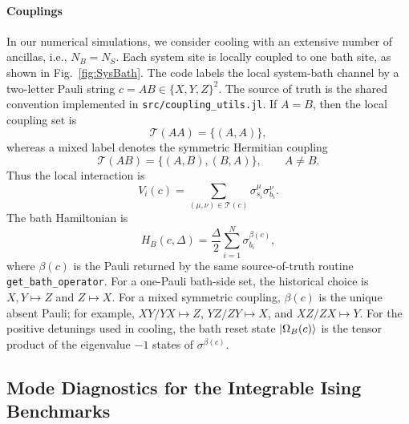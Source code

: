 \documentclass[aps,pra,twocolumn,superscriptaddress,nolongbibliography,nobalancelastpage,10pt]{revtex4-2}
\begin{document}
\paragraph{Couplings}
In our numerical simulations, we consider cooling with an extensive number of
ancillas, i.e., \(N_B=N_S\).  Each system site is locally coupled to one bath
site, as shown in Fig.~\ref{fig:SysBath}.  The code labels the local
system-bath channel by a two-letter Pauli string
\(c=AB\in\{X,Y,Z\}^2\).  The source of truth is the shared convention
implemented in \texttt{src/coupling\_utils.jl}.  If \(A=B\), then the local
coupling set is
\begin{equation}
	\mathcal{T}(AA)=\{(A,A)\},
\end{equation}
whereas a mixed label denotes the symmetric Hermitian coupling
\begin{equation}
	\mathcal{T}(AB)=\{(A,B),(B,A)\},
	\qquad A\neq B .
\end{equation}
Thus the local interaction is
\begin{equation}
	V_i(c)=\sum_{(\mu,\nu)\in\mathcal{T}(c)}
	\sigma^\mu_{s_i}\sigma^\nu_{b_i}.
	\label{eq:tn_local_coupling_convention}
\end{equation}
The bath Hamiltonian is
\begin{equation}
	H_B(c,\Delta)=\frac{\Delta}{2}\sum_{i=1}^N
	\sigma^{\beta(c)}_{b_i},
\end{equation}
where \(\beta(c)\) is the Pauli returned by the same source-of-truth routine
\texttt{get\_bath\_operator}.  For a one-Pauli bath-side set, the historical
choice is \(X,Y\mapsto Z\) and \(Z\mapsto X\).  For a mixed symmetric
coupling, \(\beta(c)\) is the unique absent Pauli; for example,
\(XY/YX\mapsto Z\), \(YZ/ZY\mapsto X\), and \(XZ/ZX\mapsto Y\).  For the
positive detunings used in cooling, the bath reset state
\(\ket{\Omega_B(c)}\) is the tensor product of the eigenvalue \(-1\) states
of \(\sigma^{\beta(c)}\).

\subsection{Mode Diagnostics for the Integrable Ising Benchmarks}
\label{sec:TNModeDiagnostics}
\end{document}

